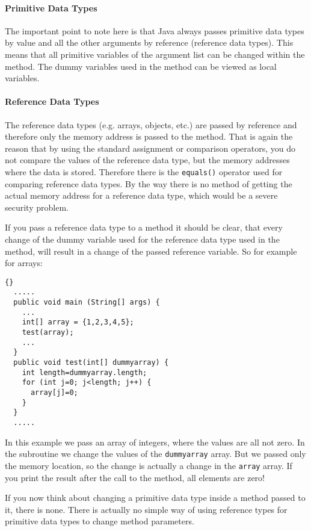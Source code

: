 \paragraph{Primitive Data Types}
The important point to note here is that Java always
passes primitive data types by value and all the other
arguments by reference (reference data types). 
This means that all primitive
variables of the argument list can be changed within
the method. The dummy variables used in the method 
can be viewed as local variables.

\paragraph{Reference Data Types}
The reference data types (e.g. arrays, objects, etc.)
are passed by reference and therefore only the memory
address is passed to the method. That is again the reason that
by using the standard assignment or comparison operators,
you do not compare the values of the reference data type, but
the memory addresses where the data is stored. Therefore there
is the \verb|equals()| operator used for comparing reference data
types. By the way there is no method
of getting the actual memory address for a reference data type,
which would be a severe security problem.

If you pass a reference data type to a method it should be
clear, that every change of the dummy variable used for
the reference data type used in the method, will result in a change
of the passed reference variable. So for example for arrays:
\begin{lstlisting}{}
  .....
  public void main (String[] args) {
    ...
    int[] array = {1,2,3,4,5};
    test(array);
    ...
  }
  public void test(int[] dummyarray) {
    int length=dummyarray.length;
    for (int j=0; j<length; j++) {
      array[j]=0;
    }
  }
  .....
\end{lstlisting}
In this example we pass an array of integers, where the values are all 
not zero. In the subroutine we change the values of the 
\verb|dummyarray| array.
But we passed only the memory location, so the change is actually
a change in the \verb|array| array. If you print the result after
the call to the method, all elements are zero!

If you now think about changing a primitive data type inside a method 
passed to it, there is none. There is actually 
no simple way of using reference types for primitive data types to
change method parameters. 

